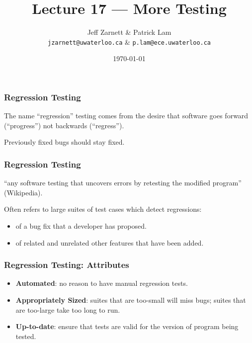 
\usepackage{alltt}

\title{Lecture 17 --- More Testing}

\author{Jeff Zarnett \& Patrick Lam \\ \small \texttt{jzarnett@uwaterloo.ca} \& \texttt{p.lam@ece.uwaterloo.ca}}
\date{\today}



\begin{frame}
  \titlepage

\end{frame}

\begin{frame}
\frametitle{Regression Testing}
\begin{changemargin}{1cm}
The name ``regression'' testing comes from the desire that software goes forward (``progress'') not backwards (``regress'').

Previously fixed bugs should stay fixed.

\end{changemargin}
\end{frame}

\begin{frame}
\frametitle{Regression Testing}

\begin{changemargin}{1cm}
``any software testing that uncovers errors
by retesting the modified program'' (Wikipedia). \\[1em]


Often refers to large
suites of test cases which detect regressions:
\begin{itemize}
\item of a bug fix that a developer has proposed.
\item of related and unrelated other features that have been added.
\end{itemize}
\end{changemargin}
\end{frame}

\begin{frame}
\frametitle{Regression Testing: Attributes}

\begin{changemargin}{1cm}

\begin{itemize}
\item \textbf{Automated}: no reason to have manual regression tests.\\[1em]
\item \textbf{Appropriately Sized}: suites that are too-small will miss bugs; suites that are too-large take too long to run.\\[1em]
\item \textbf{Up-to-date}: ensure that tests are valid for the version of program being tested.
\end{itemize}
\end{changemargin}

\end{frame}

